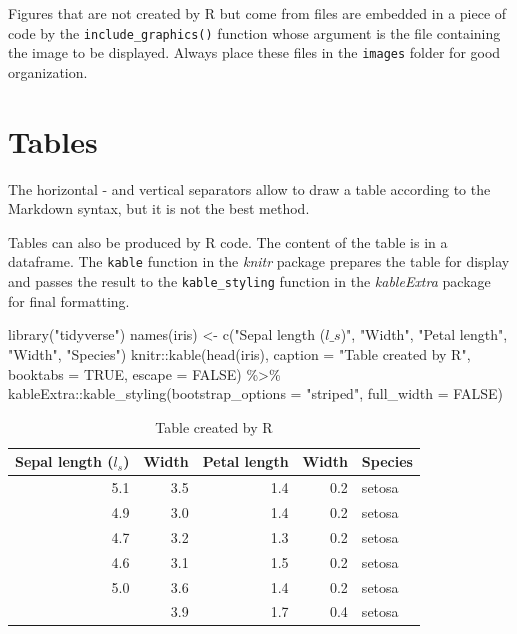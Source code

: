 \documentclass[
  12pt,
  american,
  a4paper,
  extrafontsizes,onecolumn,openright
  ]{memoir}
\newenvironment{Shaded}{\begin{snugshade}}{\end{snugshade}}
\newcommand{\AttributeTok}[1]{\textcolor[rgb]{0.77,0.63,0.00}{#1}}
\newcommand{\ConstantTok}[1]{\textcolor[rgb]{0.00,0.00,0.00}{#1}}
\newcommand{\FunctionTok}[1]{\textcolor[rgb]{0.00,0.00,0.00}{#1}}
\newcommand{\NormalTok}[1]{#1}
\newcommand{\OtherTok}[1]{\textcolor[rgb]{0.56,0.35,0.01}{#1}}
\newcommand{\SpecialCharTok}[1]{\textcolor[rgb]{0.00,0.00,0.00}{#1}}
\newcommand{\StringTok}[1]{\textcolor[rgb]{0.31,0.60,0.02}{#1}}
\begin{document}
Figures that are not created by R but come from files are embedded in a piece of code by the \texttt{include\_graphics()} function whose argument is the file containing the image to be displayed.
Always place these files in the \texttt{images} folder for good organization.

\hypertarget{tables}{%
\section{Tables}\label{tables}}

The horizontal - and vertical separators \textbar{} allow to draw a table according to the Markdown syntax, but it is not the best method.

Tables can also be produced by R code.
The content of the table is in a dataframe.
The \texttt{kable} function in the \emph{knitr} package prepares the table for display and passes the result to the \texttt{kable\_styling} function in the \emph{kableExtra} package for final formatting.

\scriptsize

\begin{Shaded}
\begin{Highlighting}[]
\FunctionTok{library}\NormalTok{(}\StringTok{"tidyverse"}\NormalTok{)}
\FunctionTok{names}\NormalTok{(iris) }\OtherTok{\textless{}{-}} \FunctionTok{c}\NormalTok{(}\StringTok{"Sepal length ($l\_s$)"}\NormalTok{, }\StringTok{"Width"}\NormalTok{, }\StringTok{"Petal length"}\NormalTok{,}
    \StringTok{"Width"}\NormalTok{, }\StringTok{"Species"}\NormalTok{)}
\NormalTok{knitr}\SpecialCharTok{::}\FunctionTok{kable}\NormalTok{(}\FunctionTok{head}\NormalTok{(iris), }\AttributeTok{caption =} \StringTok{"Table created by R"}\NormalTok{, }\AttributeTok{booktabs =} \ConstantTok{TRUE}\NormalTok{,}
    \AttributeTok{escape =} \ConstantTok{FALSE}\NormalTok{) }\SpecialCharTok{\%\textgreater{}\%}
\NormalTok{    kableExtra}\SpecialCharTok{::}\FunctionTok{kable\_styling}\NormalTok{(}\AttributeTok{bootstrap\_options =} \StringTok{"striped"}\NormalTok{,}
        \AttributeTok{full\_width =} \ConstantTok{FALSE}\NormalTok{)}
\end{Highlighting}
\end{Shaded}

\begin{table}

\caption{\label{tab:kable}Table created by R}
\centering
\begin{tabular}[t]{rrrrl}
\toprule
Sepal length ($l_s$) & Width & Petal length & Width & Species\\
\midrule
5.1 & 3.5 & 1.4 & 0.2 & setosa\\
4.9 & 3.0 & 1.4 & 0.2 & setosa\\
4.7 & 3.2 & 1.3 & 0.2 & setosa\\
4.6 & 3.1 & 1.5 & 0.2 & setosa\\
5.0 & 3.6 & 1.4 & 0.2 & setosa\\
\addlinespace
5.4 & 3.9 & 1.7 & 0.4 & setosa\\
\bottomrule
\end{tabular}
\end{table}
\end{document}
